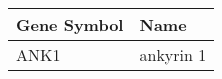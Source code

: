 \begin{tabular}{ll}
\toprule
Gene Symbol &      Name \\
\midrule
       ANK1 & ankyrin 1 \\
\bottomrule
\end{tabular}
